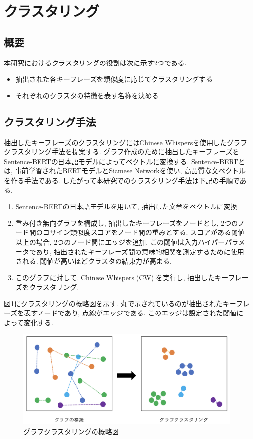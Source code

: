 
\section{クラスタリング}
\subsection{概要}
本研究におけるクラスタリングの役割は次に示す2つである. 
\begin{itemize}
  \item 抽出された各キーフレーズを類似度に応じてクラスタリングする
  \item それぞれのクラスタの特徴を表す名称を決める
\end{itemize}

\subsection{クラスタリング手法}\label{graph_clustering}
抽出したキーフレーズのクラスタリングにはChinese Whispers\cite{chinese-whispers}を使用したグラフクラスタリング手法を提案する. グラフ作成のために抽出したキーフレーズをSentence-BERTの日本語モデルによってベクトルに変換する. Sentence-BERT\cite{sentence-bert}とは, 事前学習されたBERTモデルとSiamese Networkを使い, 高品質な文ベクトルを作る手法である. 
したがって本研究でのクラスタリング手法は下記の手順である. 
\begin{enumerate}
  \item Sentence-BERTの日本語モデルを用いて, 抽出した文章をベクトルに変換
  \item 重み付き無向グラフを構成し, 抽出したキーフレーズをノードとし, 2つのノード間のコサイン類似度スコアをノード間の重みとする. スコアがある閾値以上の場合, 2つのノード間にエッジを追加. この閾値は入力ハイパーパラメータであり, 抽出されたキーフレーズ間の意味的相関を測定するために使用される. 閾値が高いほどクラスタの結束力が高まる. 
  \item このグラフに対して, Chinese Whispers (CW) を実行し, 抽出したキーフレーズをクラスタリング. 
\end{enumerate}

図\ref{fig:clustering}にクラスタリングの概略図を示す. 丸で示されているのが抽出されたキーフレーズを表すノードであり, 点線がエッジである. このエッジは設定された閾値によって変化する. 
\begin{figure}[H]
  \centering
  \includegraphics[scale=0.4]
       {contents/images/clustering.png}
  \caption{グラフクラスタリングの概略図\label{fig:clustering}}
\end{figure}


